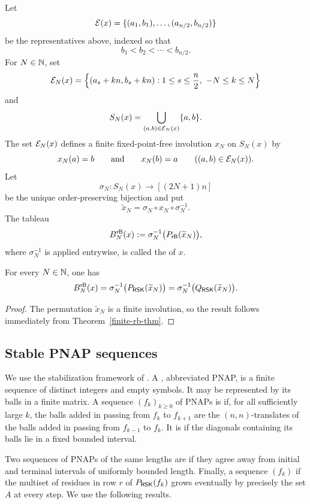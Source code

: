 \documentclass[11pt]{article}
\begin{document}
\begin{definition}
\label{complete-cycle-def}
Let
\[
\mathcal E(x)=\{(a_1,b_1),\ldots,(a_{n/2},b_{n/2})\}
\]
be the representatives above, indexed so that
\[
b_1<b_2<\cdots<b_{n/2}.
\]
For $N\in\mathbb{N}$, set
\[
\mathcal E_N(x)
=
\left\{
(a_s+kn,b_s+kn):
1\leq s\leq \frac n2,\ -N\leq k\leq N
\right\}
\]
and
\[
S_N(x)=
\bigcup_{(a,b)\in\mathcal E_N(x)}\{a,b\}.
\]
The set $\mathcal E_N(x)$ defines a finite fixed-point-free involution
$x_N$ on $S_N(x)$ by
\[
x_N(a)=b
\qquad\text{and}\qquad
x_N(b)=a
\qquad ((a,b)\in\mathcal E_N(x)).
\]
Let
\[
\sigma_N:S_N(x)\longrightarrow[(2N+1)n]
\]
be the unique order-preserving bijection and put
\[
\widetilde{x}_N
=
\sigma_N\circ x_N\circ\sigma_N^{-1}.
\]
The tableau
\[
B^{\mathsf{rB}}_N(x)
:=
\sigma_N^{-1}\bigl(P_{\mathsf{rB}}(\widetilde{x}_N)\bigr),
\]
where $\sigma_N^{-1}$ is applied entrywise, is called the
 of $x$.
\end{definition}

\begin{proposition}
\label{rb-rsk-trunc-prop}
For every $N\in\mathbb{N}$, one has
\[
B^{\mathsf{rB}}_N(x)
=
\sigma_N^{-1}\bigl(P_{\mathsf{RSK}}(\widetilde{x}_N)\bigr)
=
\sigma_N^{-1}\bigl(Q_{\mathsf{RSK}}(\widetilde{x}_N)\bigr).
\]
\end{proposition}

\begin{proof}
The permutation $\widetilde{x}_N$ is a finite involution, so the result
follows immediately from Theorem~\ref{finite-rb-thm}.
\end{proof}

\subsection{Stable PNAP sequences}

We use the stabilization framework of \cite[Section~12]{CPY}.  A
, abbreviated PNAP, is a finite
sequence of distinct integers and empty symbols.  It may be represented by
its balls in a finite matrix.  A sequence $(f_k)_{k\geq0}$ of PNAPs is
 if, for all sufficiently large $k$, the balls added in
passing from $f_k$ to $f_{k+1}$ are the $(n,n)$-translates of the balls
added in passing from $f_{k-1}$ to $f_k$.  It is 
if the diagonals containing its balls lie in a fixed bounded interval.

Two sequences of PNAPs of the same lengths are 
if they agree away from initial and terminal intervals of uniformly
bounded length.  Finally, a sequence $(f_k)$  if the multiset of residues in row $r$ of
$P_{\mathsf{RSK}}(f_k)$ grows eventually by precisely the set $A$ at every step.
We use the following results.
\end{document}
